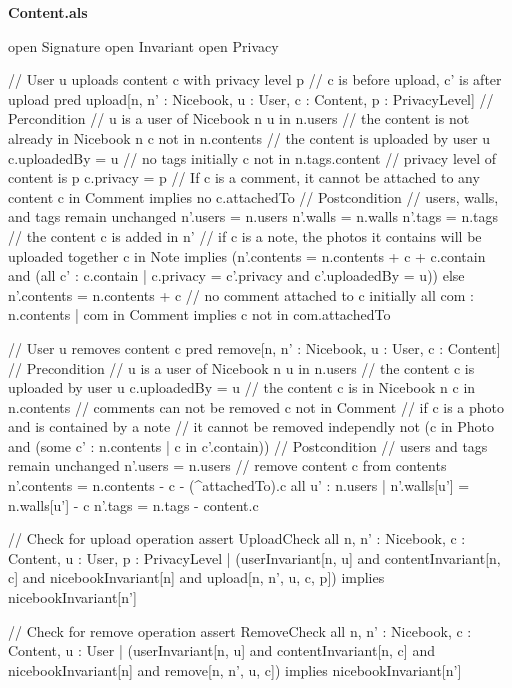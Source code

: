 \documentclass[titlepage]{article}
\begin{document}
{\bf\large Content.als}
\begin{alloy}
open Signature
open Invariant
open Privacy

// User u uploads content c with privacy level p
// c is before upload, c' is after upload
pred upload[n, n' : Nicebook, u : User, c : Content, p : PrivacyLevel]
{
    // Percondition
    // u is a user of Nicebook n
    u in n.users
    // the content is not already in Nicebook n
    c not in n.contents
    // the content is uploaded by user u
    c.uploadedBy = u
    // no tags initially
    c not in n.tags.content
    // privacy level of content is p
    c.privacy = p
    // If c is a comment, it cannot be attached to any content
    c in Comment implies no c.attachedTo
    // Postcondition
    // users, walls, and tags remain unchanged
    n'.users = n.users
    n'.walls = n.walls
    n'.tags = n.tags
    // the content c is added in n'
    // if c is a note, the photos it contains will be uploaded together
    c in Note implies (n'.contents = n.contents + c + c.contain and 
        (all c' : c.contain | c.privacy = c'.privacy and c'.uploadedBy = u))
        else n'.contents = n.contents + c
    // no comment attached to c initially
    all com : n.contents | 
        com in Comment implies c not in com.attachedTo
}

// User u removes content c
pred remove[n, n' : Nicebook, u : User, c : Content] 
{
    // Precondition
    // u is a user of Nicebook n
    u in n.users
    // the content c is uploaded by user u
    c.uploadedBy = u
    // the content c is in Nicebook n
    c in n.contents
    // comments can not be removed
    c not in Comment
    // if c is a photo and is contained by a note
    // it cannot be removed independly
    not (c in Photo and (some c' : n.contents | c in c'.contain))
    // Postcondition
    // users and tags remain unchanged
    n'.users = n.users
    // remove content c from contents
    n'.contents = n.contents - c - (^attachedTo).c
    all u' : n.users | n'.walls[u'] = n.walls[u'] - c
    n'.tags = n.tags - content.c
}

// Check for upload operation
assert UploadCheck {
    all n, n' : Nicebook, c : Content, u : User, p : PrivacyLevel | 
        (userInvariant[n, u] and contentInvariant[n, c] and nicebookInvariant[n] 
            and upload[n, n', u, c, p]) implies nicebookInvariant[n']
}

// Check for remove operation
assert RemoveCheck {
    all n, n' : Nicebook, c : Content, u : User | 
        (userInvariant[n, u] and contentInvariant[n, c] and nicebookInvariant[n] 
            and remove[n, n', u, c]) implies nicebookInvariant[n']
}


\end{alloy}
\end{document}
